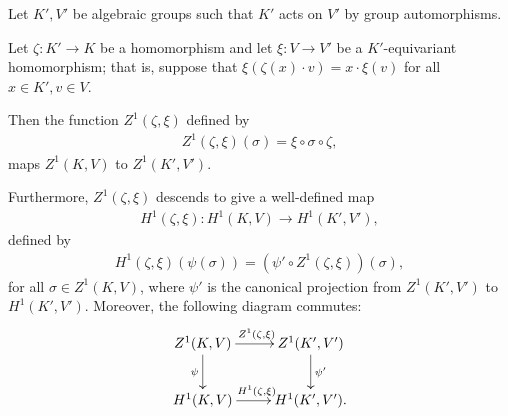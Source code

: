 \begin{lemma} \label{h1maps} Let $K', V'$ be algebraic groups such that $K'$ acts on $V'$ by group automorphisms.

	Let $\zeta:K' \rightarrow K$ be a homomorphism and let $\xi: V \rightarrow V'$ be a $K'$-equivariant homomorphism; that is, suppose that $\xi(\zeta(x) \cdot v) = x \cdot \xi(v)$ for all $x \in K', v \in V$.

	Then the function $Z^1(\zeta, \xi)$ defined by
	\begin{align*}
		Z^1(\zeta, \xi)(\sigma) = \xi \circ \sigma \circ \zeta,
	\end{align*}
	maps $Z^1(K, V)$ to $Z^1(K', V')$.

	Furthermore, $Z^1(\zeta, \xi)$ descends to give a well-defined map
	\begin{align*}
		H^1(\zeta, \xi):H^1(K, V) \rightarrow H^1(K', V'),
	\end{align*}
	defined by
	\begin{align*}
		H^1(\zeta, \xi)(\psi(\sigma)) = \left(\psi' \circ Z^1(\zeta, \xi)\right)(\sigma),
	\end{align*}
	for all $\sigma \in Z^1(K, V)$, where $\psi'$ is the canonical projection from $Z^1(K', V')$ to $H^1(K', V')$.
	Moreover, the following diagram commutes:
	\begin{align*}
		\xymatrix{
			Z^1(K, V) \ar[r]^{Z^1(\zeta, \xi)} \ar[d]_{\psi} & Z^1(K', V') \ar[d]^{\psi'} \\
			H^1(K, V) \ar[r]^{H^1(\zeta, \xi)}               & H^1(K', V').
		}
	\end{align*}
\end{lemma}
